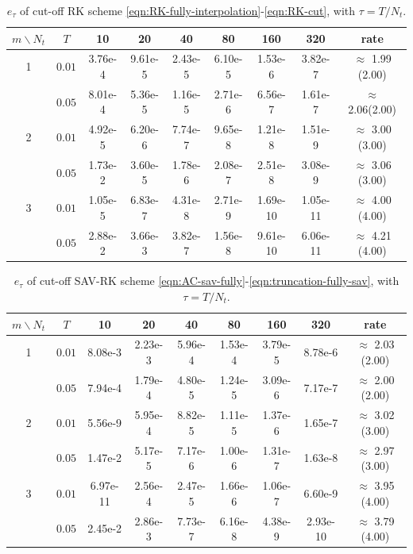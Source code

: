 \begin{table}[h]
\centering
\caption{$e_\tau$ of cut-off RK scheme \eqref{eqn:RK-fully-interpolation}-\eqref{eqn:RK-cut}, with $\tau=T/N_t$.}
\label{table:ex1_time}
\begin{tabular}{|c|c|cccccc|c|}
\hline
$m\backslash N_t$  & $T$   &10 &20 &40 &80 &160 & 320 & rate \\
\hline
1   &   $ 0.01$& 3.76e-4& 9.61e-5& 2.43e-5& 6.10e-5& 1.53e-6& 3.82e-7 &$\approx$ 1.99 (2.00)    \\
    &   $ 0.05$ & 8.01e-4& 5.36e-5& 1.16e-5& 2.71e-6& 6.56e-7& 1.61e-7 &$\approx$ 2.06(2.00)   \\
\hline
2   &   $ 0.01$& 4.92e-5& 6.20e-6& 7.74e-7& 9.65e-8& 1.21e-8& 1.51e-9 &$\approx$ 3.00 (3.00)    \\
    &   $ 0.05$ & 1.73e-2& 3.60e-5& 1.78e-6& 2.08e-7& 2.51e-8& 3.08e-9 &$\approx$ 3.06 (3.00)    \\
\hline
3   &   $0.01$& 1.05e-5& 6.83e-7& 4.31e-8& 2.71e-9& 1.69e-10& 1.05e-11 &$\approx$ 4.00 (4.00)    \\
    &   $0.05$ & 2.88e-2& 3.66e-3& 3.82e-7& 1.56e-8& 9.61e-10& 6.06e-11 &$\approx$ 4.21 (4.00)    \\
\hline
\end{tabular}
\end{table}




 \begin{table}[!h]
\centering
\caption{$e_\tau$ of cut-off SAV-RK scheme \eqref{eqn:AC-sav-fully}-\eqref{eqn:truncation-fully-sav}, with $\tau=T/N_t$.}
\label{table:ex1_time-sav}
\begin{tabular}{|c|c|cccccc|c|}
\hline
$m\backslash N_t$  & $T$   &10 &20 &40 &80 &160 & 320 & rate \\
\hline
1   &   $0.01$& 8.08e-3& 2.23e-3& 5.96e-4& 1.53e-4& 3.79e-5& 8.78e-6 &$\approx$ 2.03 (2.00)    \\
    &   $0.05$& 7.94e-4& 1.79e-4& 4.80e-5& 1.24e-5& 3.09e-6& 7.17e-7 &$\approx$ 2.00 (2.00)   \\
\hline
2   &   $0.01$& 5.56e-9& 5.95e-4& 8.82e-5& 1.11e-5& 1.37e-6& 1.65e-7 &$\approx$ 3.02 (3.00)    \\
    &   $0.05$& 1.47e-2& 5.17e-5& 7.17e-6& 1.00e-6& 1.31e-7& 1.63e-8 &$\approx$ 2.97 (3.00)    \\
\hline
3   &   $0.01$& 6.97e-11& 2.56e-4& 2.47e-5& 1.66e-6& 1.06e-7& 6.60e-9 &$\approx$ 3.95 (4.00)    \\
    &   $0.05$& 2.45e-2& 2.86e-3& 7.73e-7& 6.16e-8& 4.38e-9& 2.93e-10 &$\approx$ 3.79 (4.00)    \\
\hline
\end{tabular}
\end{table}


